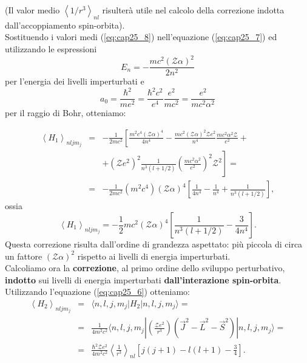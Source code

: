 \documentclass[a4paper,12pt,oneside]{book}
\begin{document}
(Il valor medio $\left<1/r^3\right>_{nl}$ risulterà utile nel calcolo della correzione indotta dall'accoppiamento spin-orbita). \\
Sostituendo i valori medi (\ref{eq:cap25_8}) nell'equazione (\ref{eq:cap25_7}) ed utilizzando le espressioni
\begin{equation} 
E_n=-\frac{mc^2 \left(\mathcal{Z}\alpha\right)^2}{2n^2} 
\end{equation}
per l'energia dei livelli imperturbati e 
\begin{equation} 
a_0=\frac{\hbar^2}{me^2}=\frac{\hbar^2c^2}{e^4}\frac{e^2}{mc^2}=\frac{e^2}{mc^2\alpha^2}
\end{equation}
per il raggio di Bohr, otteniamo:

\begin{eqnarray} 
 \left< H_1 \right>_{nljm_j} & =& -\frac{1}{2mc^2} \left[ \frac{m^2c^4 \left( \mathcal{Z} \alpha \right)^4}{4n^4}-\frac{mc^2 \left( \mathcal{Z} \alpha \right)^2 \mathcal{Z} e^2}{n^4} \frac{mc^2\alpha^2 \mathcal{Z}}{e^2}+ \right. \nonumber \\
& &\left. + \left( \mathcal{Z} e^2 \right)^2 \frac{1}{n^3(l+1/2)} \left(\frac{mc^2\alpha^2}{e^2} \right)^2 \mathcal{Z}^2 \right] = \nonumber  \\
& = & -\frac{1}{2mc^2} \left( m^2c^4 \right) \left( \mathcal{Z} \alpha\right)^4 \left[ \frac{1}{4n^4}-\frac{1}{n^4}+\frac{1}{n^3(l+1/2)}  \right] ,
\end{eqnarray}
ossia
\begin{equation} \label{eq:cap25_9}
\left< H_1 \right>_{nljm_j} = -\frac{1}{2}mc^2 \left( \mathcal{Z} \alpha \right)^4 \left[ \frac{1}{n^3(l+1/2)}-\frac{3}{4n^4}\right]  .
\end{equation}
Questa correzione risulta dall'ordine di grandezza aspettato: più piccola di circa un fattore $\left( \mathcal{Z} \alpha \right)^2$ rispetto ai livelli di energia imperturbati. \\
Calcoliamo ora la \textbf{correzione}, al primo ordine dello sviluppo perturbativo, \textbf{indotto} sui livelli di energia imperturbati \textbf{dall'interazione spin-orbita}. \\ 
Utilizzando l'equazione (\ref{eq:cap25_6}) otteniamo:
\begin{eqnarray} \label{eq:cap25_10}
\left< H_2 \right>_{nljm_j} &=& \langle n,l,j,m_j | H_2 | n,l,j,m_j \rangle = \nonumber  \\
& = &\frac{1}{4m^2c^2} \langle n,l,j,m_j | \left( \frac{\mathcal{Z}e^2}{r^3} \right) \left( \vec{J}^2-\vec{L}^2-\vec{S}^2 \right)      | n,l,j,m_j \rangle= \nonumber  \\
& = & \frac{\hbar^2\mathcal{Z}e^2}{4m^2c^2} \left< \frac{1}{r^3} \right>_{nl} \left[ j(j+1)-l(l+1)-\frac{3}{4}  \right] .
\end{eqnarray}
\end{document}
